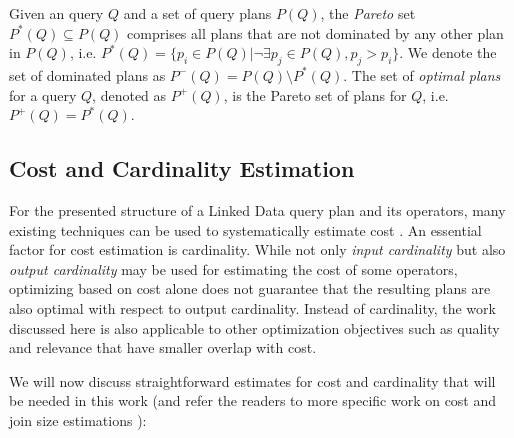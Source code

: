 \begin{definition}
  Given an query $Q$ and a set of query plans $P(Q)$, the \emph{Pareto}
  set $P^*(Q) \subseteq P(Q)$ comprises all plans that are not
  dominated by any other plan in $P(Q)$, i.e. $P^*(Q) = \{p_i \in P(Q) | \neg\exists p_j\in P(Q), p_j  > p_i\}$. We denote the set of
  dominated plans as $P^-(Q) = P(Q) \setminus P^*(Q)$. The set of \emph{optimal plans} for a query $Q$, denoted as $P^+(Q)$, is the Pareto set of plans for $Q$, i.e. $P^+(Q) = P^*(Q)$.
\end{definition}

\subsection{Cost and Cardinality Estimation}
\label{sec:estimation}
For the presented structure of a Linked Data query plan and its operators, many existing techniques can be used to systematically estimate cost . An essential factor for cost estimation is cardinality. While not only \emph{input cardinality} but also \emph{output cardinality} may be used for estimating the cost of some operators, optimizing based on cost alone does not guarantee that the resulting plans are also optimal with respect to output cardinality. Instead of cardinality, the work discussed here is also applicable to other optimization objectives such as quality and relevance that have smaller overlap with cost. 

We will now discuss straightforward estimates for cost and cardinality that will be needed in this work (and refer the readers to more specific work on cost and join size estimations ):


